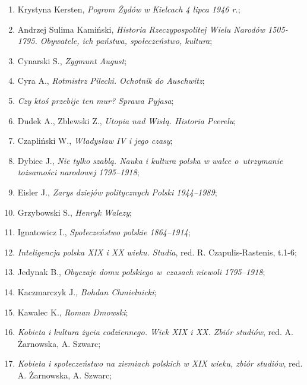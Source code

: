 \documentclass[a4paper,11pt]{article}
\begin{document}
\begin{enumerate}
\item Krystyna Kersten, \emph{Pogrom Żydów w Kielcach 4 lipca 1946
    r.};

\item Andrzej Sulima Kamiński, \emph{Historia Rzeczypospolitej Wielu
    Narodów 1505-1795. Obywatele, ich państwa, społeczeństwo,
    kultura};

\item Cynarski S., \emph{Zygmunt August};

\item Cyra A., \emph{Rotmistrz Pilecki. Ochotnik do Auschwitz};

\item \emph{Czy ktoś przebije ten mur? Sprawa Pyjasa};

\item Dudek A., Zblewski Z., \emph{Utopia nad Wisłą. Historia
    Peerelu};

\item Czapliński W., \emph{Władysław IV i jego czasy};

\item Dybiec J., \emph{Nie tylko szablą. Nauka i kultura polska w
    walce o~utrzymanie tożsamości narodowej 1795--1918};

\item Eisler J., \emph{Zarys dziejów politycznych Polski 1944--1989};

\item Grzybowski S., \emph{Henryk Walezy};

\item Ignatowicz I., \emph{Społeczeństwo polskie 1864--1914};

\item \emph{Inteligencja polska XIX i XX wieku. Studia}, red. R.
  Czapulis-Rastenis, t.1-6;

\item Jedynak B., \emph{Obyczaje domu polskiego w~czasach niewoli
    1795--1918};

\item Kaczmarczyk J., \emph{Bohdan Chmielnicki};

\item Kawalec K., \emph{Roman Dmowski};

\item \emph{Kobieta i kultura życia codziennego. Wiek XIX i XX. Zbiór
    studiów}, red. A. Żarnowska, A. Szwarc;

\item \emph{Kobieta i społeczeństwo na ziemiach polskich w XIX wieku,
    zbiór studiów}, red. A. Żarnowska, A. Szwarc;


\end{enumerate}
\end{document}
